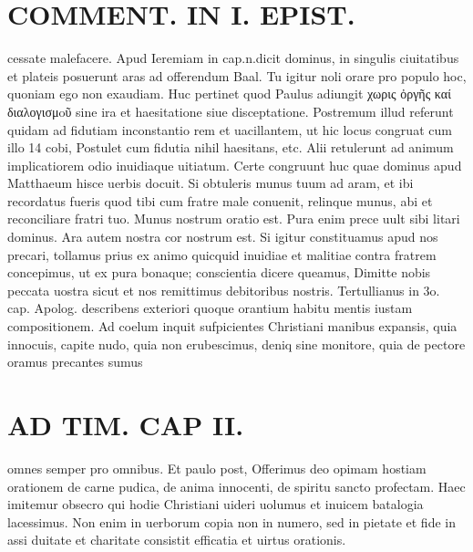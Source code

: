 \documentclass{article}
\begin{document}
\begin{pages}
\section*{COMMENT. IN I. EPIST. }\pstart cessate malefacere. Apud Ieremiam in cap.n.dicit dominus, in singulis ciuitatibus et plateis posuerunt aras ad offerendum Baal. Tu igitur noli orare pro populo hoc, quoniam ego non exaudiam. Huc pertinet quod Paulus adiungit χωρις ὀργῆς καί διαλογισμoῦ sine ira et haesitatione siue disceptatione. Postremum illud referunt quidam ad fidutiam inconstantio rem et uacillantem, ut hic locus congruat cum illo 14 cobi, Postulet cum fidutia nihil haesitans, etc. Alii retulerunt ad animum implicatiorem odio inuidiaque uitiatum. Certe congruunt huc quae dominus apud Matthaeum hisce uerbis docuit. Si obtuleris munus tuum ad aram, et ibi recordatus fueris quod tibi cum fratre male conuenit, relinque munus, abi et reconciliare fratri tuo. Munus nostrum oratio est. Pura enim prece uult sibi litari dominus. Ara autem nostra cor nostrum est. Si igitur constituamus apud nos precari, tollamus prius ex animo quicquid inuidiae et malitiae contra fratrem concepimus, ut ex pura bonaque; conscientia dicere queamus, Dimitte nobis peccata uostra sicut et nos remittimus debitoribus nostris. Tertullianus in 3o. cap. Apolog. describens exteriori quoque orantium habitu mentis iustam compositionem. Ad coelum inquit sufpicientes Christiani manibus expansis, quia innocuis, capite nudo, quia non erubescimus, deniq sine monitore, quia de pectore oramus precantes sumus  \pend
\section*{AD TIM. CAP II. }
\marginpar{[ p.119 ]}\pstart omnes semper pro omnibus. Et paulo post, Offerimus deo opimam hostiam orationem de carne pudica, de anima innocenti, de spiritu sancto profectam. Haec imitemur obsecro qui hodie Christiani uideri uolumus et inuicem batalogia lacessimus. Non enim in uerborum copia non in numero, sed in pietate et fide in assi duitate et charitate consistit efficatia et uirtus orationis.  \pend
{}
{}

\end{pages}
\end{document}
